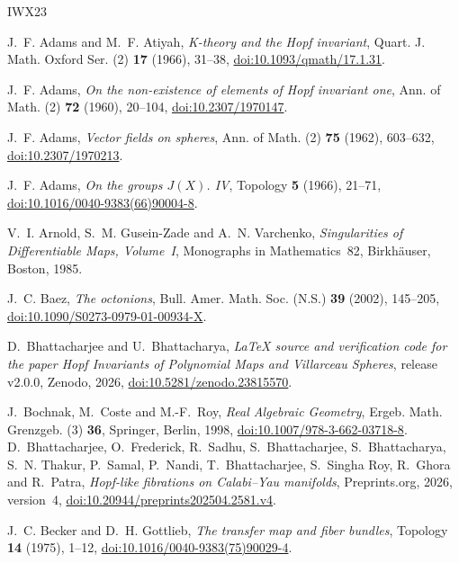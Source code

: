 \documentclass[11pt]{amsart}
\numberwithin{equation}{section}
\theoremstyle{plain}
\theoremstyle{definition}
\theoremstyle{remark}
\begin{document}
\begin{thebibliography}{IWX23}

 J.~F. Adams and M.~F. Atiyah, \emph{K-theory and the Hopf invariant}, Quart. J. Math. Oxford Ser. (2) \textbf{17} (1966), 31--38, \href{https://doi.org/10.1093/qmath/17.1.31}{doi:10.1093/qmath/17.1.31}.

 J.~F. Adams, \emph{On the non-existence of elements of Hopf invariant one}, Ann. of Math. (2) \textbf{72} (1960), 20--104, \href{https://doi.org/10.2307/1970147}{doi:10.2307/1970147}.

 J.~F. Adams, \emph{Vector fields on spheres}, Ann. of Math. (2) \textbf{75} (1962), 603--632, \href{https://doi.org/10.2307/1970213}{doi:10.2307/1970213}.

 J.~F. Adams, \emph{On the groups $J(X)$. IV}, Topology \textbf{5} (1966), 21--71, \href{https://doi.org/10.1016/0040-9383(66)90004-8}{doi:10.1016/0040-9383(66)90004-8}.

 V.~I. Arnold, S.~M. Gusein-Zade and A.~N. Varchenko, \emph{Singularities of Differentiable Maps, Volume~I}, Monographs in Mathematics~82, Birkh\"auser, Boston, 1985.

 J.~C. Baez, \emph{The octonions}, Bull. Amer. Math. Soc. (N.S.) \textbf{39} (2002), 145--205, \href{https://doi.org/10.1090/S0273-0979-01-00934-X}{doi:10.1090/S0273-0979-01-00934-X}.

 D.~Bhattacharjee and U.~Bhattacharya, \emph{LaTeX source and verification code for the paper Hopf Invariants of Polynomial Maps and Villarceau Spheres}, release v2.0.0, Zenodo, 2026, \href{https://doi.org/10.5281/zenodo.23815570}{doi:10.5281/zenodo.23815570}.

 J.~Bochnak, M.~Coste and M.-F.~Roy, \emph{Real Algebraic Geometry}, Ergeb. Math. Grenzgeb. (3) \textbf{36}, Springer, Berlin, 1998, \href{https://doi.org/10.1007/978-3-662-03718-8}{doi:10.1007/978-3-662-03718-8}.
 D.~Bhattacharjee, O.~Frederick, R.~Sadhu, S.~Bhattacharjee, S.~Bhattacharya, S.~N. Thakur, P.~Samal, P.~Nandi, T.~Bhattacharjee, S.~Singha Roy, R.~Ghora and R.~Patra, \emph{Hopf-like fibrations on Calabi--Yau manifolds}, Preprints.org, 2026, version~4, \href{https://doi.org/10.20944/preprints202504.2581.v4}{doi:10.20944/preprints202504.2581.v4}.

 J.~C. Becker and D.~H. Gottlieb, \emph{The transfer map and fiber bundles}, Topology \textbf{14} (1975), 1--12, \href{https://doi.org/10.1016/0040-9383(75)90029-4}{doi:10.1016/0040-9383(75)90029-4}.


\end{thebibliography}
\end{document}
